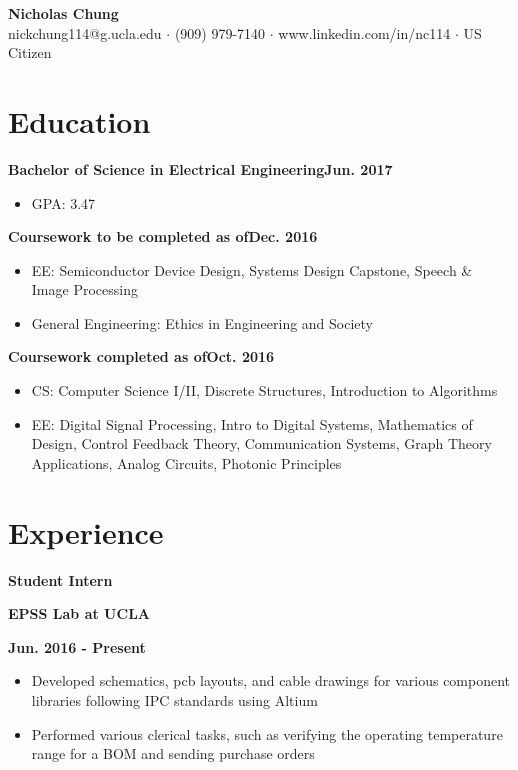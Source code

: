 \documentclass[12pt]{article}
\newcommand\textbox[1]{\parbox{.333\textwidth}{#1}}
\newcommand{\textlcr}[3]{\textbox{\textbf{#1}\hfill}\textbox{\hfil \textbf{#2}\hfil}\textbox{\hfill \textbf{#3}}}
\begin{document}
\begin{center}
	\textbf{\LARGE Nicholas Chung} \\ \vspace{.5ex}
	nickchung114@g.ucla.edu $\cdot$ (909) 979-7140 $\cdot$ www.linkedin.com/in/nc114 $\cdot$ US Citizen
\end{center}

\vspace{-8pt}
\smallskip
\section*{Education}
\vspace*{-1em}\makebox[\linewidth]{\rule{\textwidth}{0.4pt}}

\textbf{Bachelor of Science in Electrical Engineering}\hfill\textbf{Jun. 2017}
\begin{itemize}
\item GPA: 3.47
\end{itemize}

\textbf{Coursework to be completed as of}\hfill\textbf{Dec. 2016}
\begin{itemize}
\item EE: Semiconductor Device Design, Systems Design Capstone, Speech \& Image Processing
\item General Engineering: Ethics in Engineering and Society
\end{itemize}

\textbf{Coursework completed as of}\hfill\textbf{Oct. 2016}
\begin{itemize}
\item CS: Computer Science I/II, Discrete Structures, Introduction to Algorithms
\item EE: Digital Signal Processing, Intro to Digital Systems, Mathematics of Design, Control Feedback Theory, Communication Systems, Graph Theory Applications, Analog Circuits, Photonic Principles
\end{itemize}

\section*{Experience}
\vspace*{-1em}\makebox[\linewidth]{\rule{\textwidth}{0.4pt}}

\textlcr{Student Intern}{EPSS Lab at UCLA}{Jun. 2016 - Present}
\begin{itemize}
\item Developed schematics, pcb layouts, and cable drawings for various component libraries following IPC standards using Altium
\item Performed various clerical tasks, such as verifying the operating temperature range for a BOM and sending purchase orders
\end{itemize}
\end{document}
